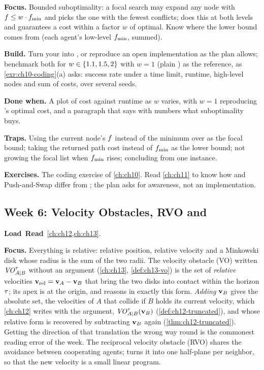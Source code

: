 \textbf{Focus.} Bounded suboptimality: a focal search may expand any node with
$f \le w \cdot f_{\min}$ and picks the one with the fewest conflicts; \ecbs does
this at both levels and guarantees a cost within a factor $w$ of optimal. Know where the
lower bound comes from (each agent's low-level $f_{\min}$, summed).

\textbf{Build.} Turn your \cbs into \ecbs, or reproduce an open implementation as the plan
allows; benchmark both for $w \in \left\{ 1.1, 1.5, 2 \right\}$ with $w = 1$ (plain \cbs) as the
reference, as \cref{exr:ch10-coding}(a) asks: success rate under a time
limit, runtime, high-level nodes and sum of costs, over several seeds.

\textbf{Done when.} A plot of cost against runtime as $w$ varies, with $w = 1$ reproducing
\cbs's optimal cost, and a paragraph that says with numbers what suboptimality buys.

\textbf{Traps.} Using the current node's $f$ instead of the minimum over \Open as the
focal bound; taking the returned path cost instead of $f_{\min}$ as the lower bound;
not growing the focal list when $f_{\min}$ rises; concluding from one instance.

\textbf{Exercises.} The coding exercise of \cref{ch:ch10}. Read \cref{ch:ch11} to know how
\mstar and Push-and-Swap differ from \cbs; the plan asks for awareness, not an
implementation.

\subsection{Week 6: Velocity Obstacles, RVO and \orca}
\label{sec:appA-week06}
\noindent\textbf{Load}\ \quad\textbf{Read}\ \cref{ch:ch12,ch:ch13}.

\textbf{Focus.} Everything is relative: relative position, relative velocity and a Minkowski
disk whose radius is the sum of the two radii. The velocity obstacle (VO) written $\mathit{VO}^{\tau}_{A|B}$ without an
argument (\cref{ch:ch13}, \cref{def:ch13-vo}) is the set of \emph{relative} velocities
$\mathbf{v}_{\mathrm{rel}} = \mathbf{v}_A - \mathbf{v}_B$ that bring the two disks into contact within the
horizon $\tau$; its apex is at the origin, and \orca reasons in exactly this form.
\emph{Adding} $\mathbf{v}_B$ gives the absolute set, the velocities of $A$ that collide if $B$
holds its current velocity, which \cref{ch:ch12} writes with the argument,
$\mathit{VO}^{\tau}_{A|B}(\mathbf{v}_B)$ (\cref{def:ch12-truncated}), and whose relative form is
recovered by subtracting $\mathbf{v}_B$ again (\cref{thm:ch12-truncated}). Getting the
direction of that translation the wrong way round is the commonest reading error of the
week. The reciprocal velocity
obstacle (RVO) shares the avoidance between cooperating agents; \orca turns it into one
half-plane per neighbor, so that the new velocity is a small linear program.

